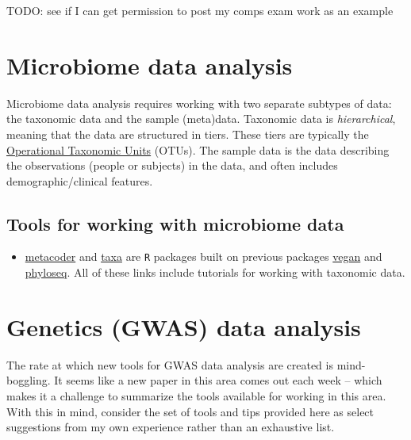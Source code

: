 \documentclass[
]{book}
\providecommand{\tightlist}{%
  \setlength{\itemsep}{0pt}\setlength{\parskip}{0pt}}
\begin{document}
TODO: see if I can get permission to post my comps exam work as an example

\hypertarget{microbiome-data-analysis}{%
\chapter{Microbiome data analysis}\label{microbiome-data-analysis}}

Microbiome data analysis requires working with two separate subtypes of data: the taxonomic data and the sample (meta)data. Taxonomic data is \emph{hierarchical}, meaning that the data are structured in tiers. These tiers are typically the \href{https://en.wikipedia.org/wiki/Operational_taxonomic_unit}{Operational Taxonomic Units} (OTUs). The sample data is the data describing the observations (people or subjects) in the data, and often includes demographic/clinical features.

\hypertarget{tools-for-working-with-microbiome-data}{%
\section{Tools for working with microbiome data}\label{tools-for-working-with-microbiome-data}}

\begin{itemize}
\tightlist
\item
  \href{https://grunwaldlab.github.io/metacoder_documentation/}{metacoder} and \href{https://docs.ropensci.org/taxa/}{taxa} are \texttt{R} packages built on previous packages \href{https://peat-clark.github.io/BIO381/veganTutorial.html}{vegan} and \href{https://vaulot.github.io/tutorials/Phyloseq_tutorial.html\#phyloseq-r-library}{phyloseq}. All of these links include tutorials for working with taxonomic data.
\end{itemize}

\hypertarget{genetics-gwas-data-analysis}{%
\chapter{Genetics (GWAS) data analysis}\label{genetics-gwas-data-analysis}}

The rate at which new tools for GWAS data analysis are created is mind-boggling. It seems like a new paper in this area comes out each week -- which makes it a challenge to summarize the tools available for working in this area. With this in mind, consider the set of tools and tips provided here as select suggestions from my own experience rather than an exhaustive list.
\end{document}
